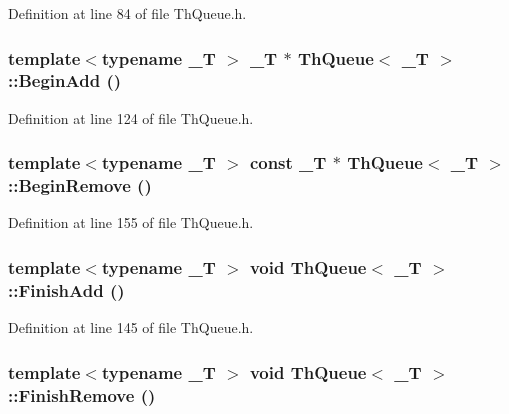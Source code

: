 Definition at line 84 of file ThQueue.h.\hypertarget{class_th_queue_39799c63788fc9dbbcf444faf58b7dad}{
\subsubsection[{BeginAdd}]{\setlength{\rightskip}{0pt plus 5cm}template$<$typename \_\-T $>$ \_\-T $\ast$ {\bf ThQueue}$<$ \_\-T $>$::BeginAdd ()}}
\label{class_th_queue_39799c63788fc9dbbcf444faf58b7dad}




Definition at line 124 of file ThQueue.h.\hypertarget{class_th_queue_1afa8d302d631714581a2c98c4735582}{
\subsubsection[{BeginRemove}]{\setlength{\rightskip}{0pt plus 5cm}template$<$typename \_\-T $>$ const \_\-T $\ast$ {\bf ThQueue}$<$ \_\-T $>$::BeginRemove ()}}
\label{class_th_queue_1afa8d302d631714581a2c98c4735582}




Definition at line 155 of file ThQueue.h.\hypertarget{class_th_queue_45d8ee9095febd417352f8ede4cac5d7}{
\subsubsection[{FinishAdd}]{\setlength{\rightskip}{0pt plus 5cm}template$<$typename \_\-T $>$ void {\bf ThQueue}$<$ \_\-T $>$::FinishAdd ()}}
\label{class_th_queue_45d8ee9095febd417352f8ede4cac5d7}




Definition at line 145 of file ThQueue.h.\hypertarget{class_th_queue_1847a76ebb7b75997e17711a019d87b1}{
\subsubsection[{FinishRemove}]{\setlength{\rightskip}{0pt plus 5cm}template$<$typename \_\-T $>$ void {\bf ThQueue}$<$ \_\-T $>$::FinishRemove ()}}
\label{class_th_queue_1847a76ebb7b75997e17711a019d87b1}




